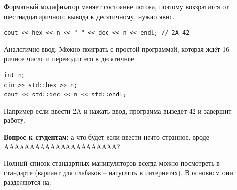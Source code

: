 \documentclass[a4paper,12pt,oneside]{article}
\newif\ifanswers
\begin{document}
Форматный модификатор меняет состояние потока, поэтому вовзратится от шестнадцатиричного вывода к десятичному, нужно явно.

\begin{lstlisting}
cout << hex << n << " " << dec << n << endl; // 2A 42
\end{lstlisting}

Аналогично ввод. Можно поиграть с простой программой, которая ждёт 16-ричное число и переводит его в десятичное.

\begin{lstlisting}
int n;
cin >> std::hex >> n;
cout << std::dec << n << std::endl;
\end{lstlisting}

Например если ввести 2A и нажать ввод, программа выведет 42 и завершит работу.

\textbf{Вопрос к студентам:} а что будет если ввести нечто странное, вроде AAAAAAAAAAAAAAAAAAAAAA?

\ifanswers
Будет поведение, зависящее от реализации. Как вариант вывод MAXINT, то есть чего-то вроде 2147483647.
\fi

Полный список стандартных манипуляторов всегда можно посмотреть в стандарте (вариант для слабаков -- нагуглить в интернетах). В основном они разделяются на:
\end{document}
